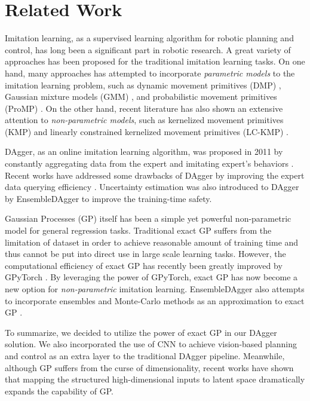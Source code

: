 \documentclass[11pt, reqno, letterpaper, twoside]{amsart}
\begin{document}
\section{Related Work}
Imitation learning, as a supervised learning algorithm for robotic planning and
control, has long been a significant part in robotic research. A great variety
of approaches has been proposed for the traditional imitation learning tasks. On
one hand, many approaches has attempted to incorporate \textit{parametric
	models} to the imitation learning problem, such as dynamic movement primitives
(DMP) \cite{dmp}, Gaussian mixture models (GMM) \cite{gmm-for-IL}, and
probabilistic movement primitives (ProMP) \cite{ProMP}. On the other hand,
recent literature has also shown an extensive attention to
\textit{non-parametric models}, such as kernelized movement primitives (KMP)
\cite{non-parametric-il} and linearly constrained kernelized movement primitives
(LC-KMP) \cite{non-parametric-il-linear-constraints}.

DAgger, as an online imitation learning algorithm, was proposed in 2011 by
constantly aggregating data from the expert and imitating expert's behaviors
\cite{dagger}. Recent works have addressed some drawbacks of DAgger by improving
the expert data querying efficiency \cite{safe-dagger}. Uncertainty estimation
was also introduced to DAgger by EnsembleDAgger \cite{ensemble-dagger} to
improve the training-time safety.

Gaussian Processes (GP) itself has been a simple yet powerful non-parametric
model for general regression tasks. Traditional exact GP suffers from the
limitation of dataset in order to achieve reasonable amount of training time and
thus cannot be put into direct use in large scale learning tasks. However, the
computational efficiency of exact GP has recently been greatly improved by
GPyTorch \cite{exact-gp-million,GPyTorch}. By leveraging the power of GPyTorch,
exact GP has now become a new option for \textit{non-parametric} imitation
learning. EnsembleDAgger also attempts to incorporate ensembles and Monte-Carlo
methods as an approximation to exact GP \cite{ensemble-dagger}.

To summarize, we decided to utilize the power of exact GP in our DAgger
solution. We also incorporated the use of CNN to achieve vision-based planning
and control as an extra layer to the traditional DAgger pipeline. Meanwhile,
although GP suffers from the curse of dimensionality, recent works have shown
that mapping the structured high-dimensional inputs to latent space
\cite{grosnit2021high} dramatically expands the capability of GP.
\end{document}
